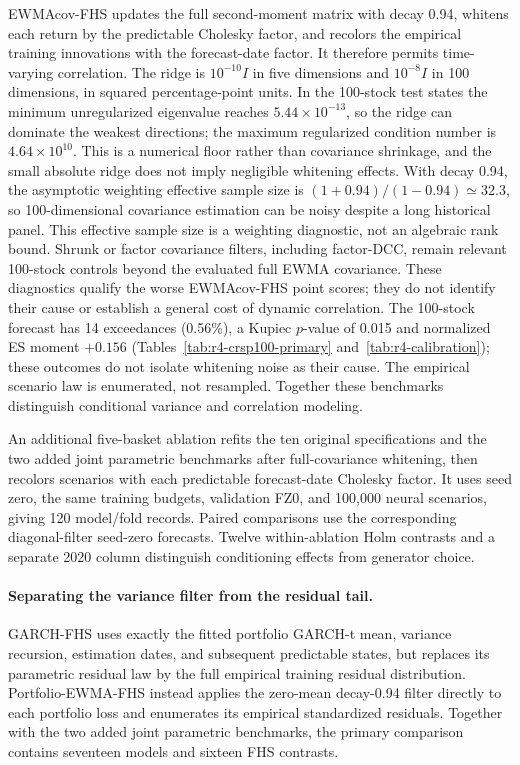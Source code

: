 \documentclass[11pt]{article}
\theoremstyle{definition}\newtheorem{definition}[theorem]{Definition}
\theoremstyle{remark}\newtheorem{remark}[theorem]{Remark}
\begin{document}
EWMAcov-FHS updates the full second-moment matrix with decay 0.94, whitens each return by the predictable Cholesky factor, and recolors the empirical training innovations with the forecast-date factor. It therefore permits time-varying correlation. The ridge is $10^{-10}I$ in five dimensions and $10^{-8}I$ in 100 dimensions, in squared percentage-point units. In the 100-stock test states the minimum unregularized eigenvalue reaches $5.44\times10^{-13}$, so the ridge can dominate the weakest directions; the maximum regularized condition number is $4.64\times10^{10}$. This is a numerical floor rather than covariance shrinkage, and the small absolute ridge does not imply negligible whitening effects. With decay 0.94, the asymptotic weighting effective sample size is $(1+0.94)/(1-0.94)\simeq32.3$, so 100-dimensional covariance estimation can be noisy despite a long historical panel. This effective sample size is a weighting diagnostic, not an algebraic rank bound. Shrunk or factor covariance filters, including factor-DCC, remain relevant 100-stock controls beyond the evaluated full EWMA covariance. These diagnostics qualify the worse EWMAcov-FHS point scores; they do not identify their cause or establish a general cost of dynamic correlation. The 100-stock forecast has 14 exceedances (0.56\%), a Kupiec $p$-value of 0.015 and normalized ES moment $+0.156$ (Tables~\ref{tab:r4-crsp100-primary} and~\ref{tab:r4-calibration}); these outcomes do not isolate whitening noise as their cause. The empirical scenario law is enumerated, not resampled. Together these benchmarks distinguish conditional variance and correlation modeling.

An additional five-basket ablation refits the ten original specifications and the two added joint parametric benchmarks after full-covariance whitening, then recolors scenarios with each predictable forecast-date Cholesky factor. It uses seed zero, the same training budgets, validation FZ0, and 100,000 neural scenarios, giving 120 model/fold records. Paired comparisons use the corresponding diagonal-filter seed-zero forecasts. Twelve within-ablation Holm contrasts and a separate 2020 column distinguish conditioning effects from generator choice. 

\paragraph{Separating the variance filter from the residual tail.}
GARCH-FHS uses exactly the fitted portfolio GARCH-t mean, variance recursion, estimation dates, and subsequent predictable states, but replaces its parametric residual law by the full empirical training residual distribution. Portfolio-EWMA-FHS instead applies the zero-mean decay-0.94 filter directly to each portfolio loss and enumerates its empirical standardized residuals. Together with the two added joint parametric benchmarks, the primary comparison contains seventeen models and sixteen FHS contrasts. 
\end{document}
